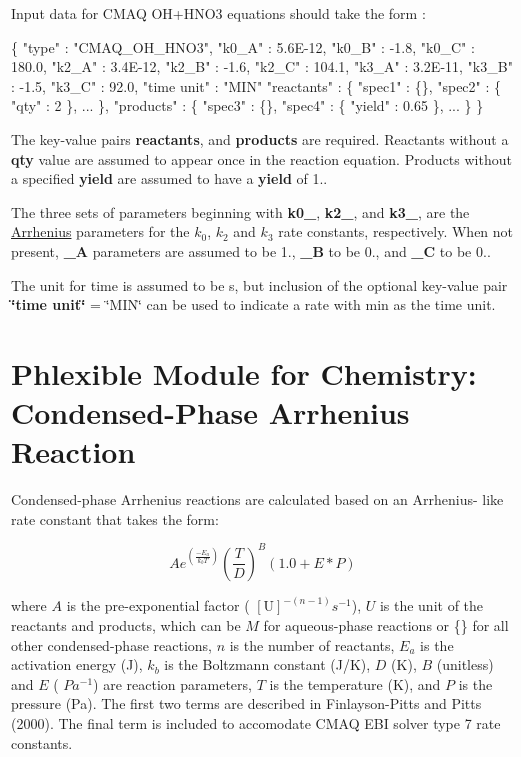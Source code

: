 Input data for C\+M\+AQ O\+H+\+H\+N\+O3 equations should take the form \+: 
\begin{DoxyCode}
\{
  "type" : "CMAQ\_OH\_HNO3",
  "k0\_A" : 5.6E-12,
  "k0\_B" : -1.8,
  "k0\_C" : 180.0,
  "k2\_A" : 3.4E-12,
  "k2\_B" : -1.6,
  "k2\_C" : 104.1,
  "k3\_A" : 3.2E-11,
  "k3\_B" : -1.5,
  "k3\_C" : 92.0,
  "time unit" : "MIN"
  "reactants" : \{
    "spec1" : \{\},
    "spec2" : \{ "qty" : 2 \},
    ...
  \},
  "products" : \{
    "spec3" : \{\},
    "spec4" : \{ "yield" : 0.65 \},
    ...
  \}
\}
\end{DoxyCode}
 The key-\/value pairs {\bfseries reactants}, and {\bfseries products} are required. Reactants without a {\bfseries qty} value are assumed to appear once in the reaction equation. Products without a specified {\bfseries yield} are assumed to have a {\bfseries yield} of 1..

The three sets of parameters beginning with {\bfseries k0\+\_\+}, {\bfseries k2\+\_\+}, and {\bfseries k3\+\_\+}, are the \mbox{\hyperlink{phlex_rxn_arrhenius}{Arrhenius}} parameters for the $k_0$, $k_2$ and $k_3$ rate constants, respectively. When not present, {\bfseries \+\_\+A} parameters are assumed to be 1., {\bfseries \+\_\+B} to be 0., and {\bfseries \+\_\+C} to be 0..

The unit for time is assumed to be s, but inclusion of the optional key-\/value pair {\bfseries \char`\"{}time unit\char`\"{}} = \char`\"{}\+M\+I\+N\char`\"{} can be used to indicate a rate with min as the time unit. \hypertarget{phlex_rxn_condensed_phase_arrhenius}{}\section{Phlexible Module for Chemistry\+: Condensed-\/\+Phase Arrhenius Reaction}\label{phlex_rxn_condensed_phase_arrhenius}
Condensed-\/phase Arrhenius reactions are calculated based on an Arrhenius-\/ like rate constant that takes the form\+:

\[ Ae^{(\frac{-E_a}{k_bT})}(\frac{T}{D})^B(1.0+E*P) \]

where $A$ is the pre-\/exponential factor ( $[\mbox{U}]^{-(n-1)} s^{-1}$), $U$ is the unit of the reactants and products, which can be $M$ for aqueous-\/phase reactions or \{\} for all other condensed-\/phase reactions, $n$ is the number of reactants, $E_a$ is the activation energy (J), $k_b$ is the Boltzmann constant (J/K), $D$ (K), $B$ (unitless) and $E$ ( $Pa^{-1}$) are reaction parameters, $T$ is the temperature (K), and $P$ is the pressure (Pa). The first two terms are described in Finlayson-\/\+Pitts and Pitts (2000). The final term is included to accomodate C\+M\+AQ E\+BI solver type 7 rate constants.

